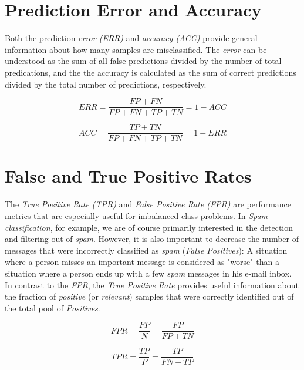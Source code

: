 \documentclass{article}
\begin{document}
\section{Prediction Error and Accuracy}

Both the prediction \emph{error (ERR)} and \emph{accuracy (ACC)} provide general information about how many samples are misclassified. The \emph{error} can be understood as the sum of all false predictions divided by the number of total predications, and the the accuracy is calculated as the sum of correct predictions divided by the total number of predictions, respectively. 

\begin{equation} ERR = \frac{FP + FN}{FP+ FN + TP + TN} = 1-ACC\end{equation}

\begin{equation} ACC = \frac{TP + TN}{FP+ FN + TP + TN} = 1-ERR\end{equation}




\section{False and True Positive Rates}

The \emph{True Positive Rate (TPR)} and \emph{False Positive Rate (FPR)} are performance metrics that are especially useful for imbalanced class problems. In \emph{Spam classification}, for example, we are of course primarily interested in the detection and filtering out of \emph{spam}. However, it is also important to decrease the number of messages that were incorrectly classified as \emph{spam} (\emph{False Positives}): A situation where a person misses an important message is considered as "worse" than a situation where a person ends up with a few \emph{spam} messages in his e-mail inbox. In contrast to the \emph{FPR}, the \emph{True Positive Rate} provides useful information about the fraction of \emph{positive} (or \emph{relevant}) samples that were correctly identified out of the total pool of \emph{Positives}.

\begin{equation} FPR = \frac{FP}{N} =  \frac{FP}{FP + TN} \end{equation}

\begin{equation} TPR = \frac{TP}{P} =  \frac{TP}{FN + TP} \end{equation}
\end{document}

